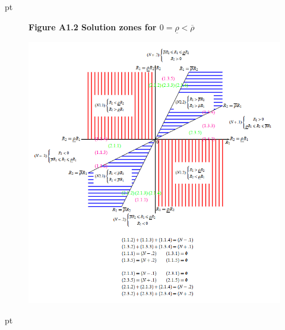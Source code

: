\documentclass[10.0pt]{article}
\begin{document}
 pt




\newpage




\begin{figure}
	\centerline{\bf Figure A1.2 \quad Solution zones for $ 0 = \underline{\rho} < \overline{\rho} $}
	\centering
	\includegraphics[width=1.1 \textwidth]{FigureA1.2.png}
\end{figure}

 pt




\newpage
\end{document}
